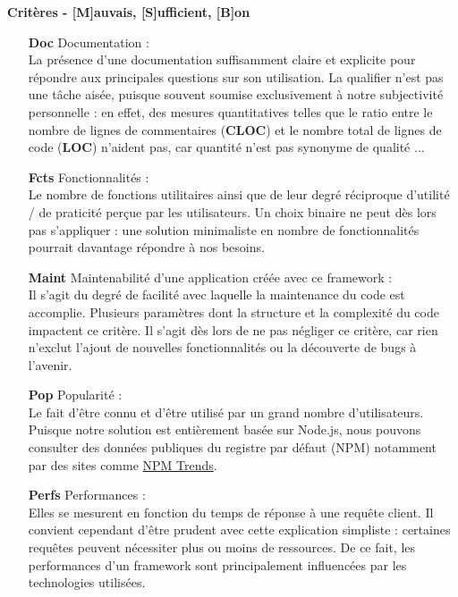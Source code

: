 \noindent\textbf{Critères - [M]auvais, [S]ufficient, [B]on}

\begin{itemize}
    \item[\textbf{Doc}] Documentation : \\
    La présence d'une documentation suffisamment claire et explicite pour répondre aux principales questions sur son utilisation.
    La qualifier n'est pas une tâche aisée, puisque souvent soumise exclusivement à notre subjectivité personnelle : en effet, des mesures quantitatives telles que le ratio entre le nombre de lignes de commentaires (\textbf{CLOC}) et le nombre total de lignes de code (\textbf{LOC}) n'aident pas, car quantité n'est pas synonyme de qualité ... 
    \item[\textbf{Fcts}] Fonctionnalités : \\
    Le nombre de fonctions utilitaires ainsi que de leur degré réciproque d'utilité / de praticité perçue par les utilisateurs. Un choix binaire ne peut dès lors pas s'appliquer : une solution minimaliste en nombre de fonctionnalités pourrait davantage répondre à nos besoins.
    \item[\textbf{Maint}] Maintenabilité d'une application créée avec ce framework : \\
    Il s'agit du degré de facilité avec laquelle la maintenance du code est accomplie. Plusieurs paramètres dont la structure et la complexité du code impactent ce critère. Il s'agit dès lors de ne pas négliger ce critère, car rien n'exclut l'ajout de nouvelles fonctionnalités ou la découverte de bugs à l'avenir.
    \item[\textbf{Pop}] Popularité : \\
    Le fait d'être connu et d'être utilisé par un grand nombre d'utilisateurs.
    Puisque notre solution est entièrement basée sur Node.js, nous pouvons consulter des données publiques du registre par défaut (NPM) notamment par des sites comme \href{https://www.npmtrends.com/}{NPM Trends}.
    \item[\textbf{Perfs}] Performances : \\
    Elles se mesurent en fonction du temps de réponse à une requête client.
    Il convient cependant d'être prudent avec cette explication simpliste : certaines requêtes peuvent nécessiter plus ou moins de ressources.
    De ce fait, les performances d'un framework sont principalement influencées par les technologies utilisées. 
\end{itemize}

